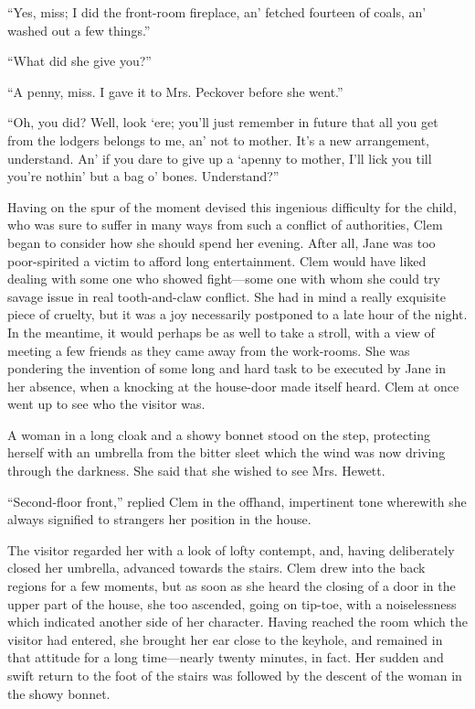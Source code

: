{\protect\hypertarget{19}{}{}}``Yes, miss; I did the front-room
fireplace, an' fetched fourteen of coals, an' washed out a few things.''

``What did she give you?''

``A penny, miss. I gave it to Mrs. Peckover before she went.''

``Oh, you did? Well, look `ere; you'll just remember in future that all
you get from the lodgers belongs to me, an' not to mother. It's a new
arrangement, understand. An' if you dare to give up a `apenny to mother,
I'll lick you till you're nothin' but a bag o' bones. Understand?''

Having on the spur of the moment devised this ingenious difficulty for
the child, who was sure to suffer in many ways from such a conflict of
authorities, Clem began to consider how she should spend her evening.
After all, Jane was too poor-spirited a victim to afford long
entertainment. Clem would have liked dealing with some one who showed
fight---some one with whom she could try savage issue in real
tooth-and-claw conflict. She had in mind a really exquisite piece
{\protect\hypertarget{20}{}{}}of cruelty, but it was a joy necessarily
postponed to a late hour of the night. In the meantime, it would perhaps
be as well to take a stroll, with a view of meeting a few friends as
they came away from the work-rooms. She was pondering the invention of
some long and hard task to be executed by Jane in her absence, when a
knocking at the house-door made itself heard. Clem at once went up to
see who the visitor was.

A woman in a long cloak and a showy bonnet stood on the step, protecting
herself with an umbrella from the bitter sleet which the wind was now
driving through the darkness. She said that she wished to see Mrs.
Hewett.

``Second-floor front,'' replied Clem in the offhand, impertinent tone
wherewith she always signified to strangers her position in the house.

The visitor regarded her with a look of lofty contempt, and, having
deliberately closed her umbrella, advanced towards the stairs. Clem drew
into the back regions for {\protect\hypertarget{21}{}{}}a few moments,
but as soon as she heard the closing of a door in the upper part of the
house, she too ascended, going on tip-toe, with a noiselessness which
indicated another side of her character. Having reached the room which
the visitor had entered, she brought her ear close to the keyhole, and
remained in that attitude for a long time---nearly twenty minutes, in
fact. Her sudden and swift return to the foot of the stairs was followed
by the descent of the woman in the showy bonnet.

